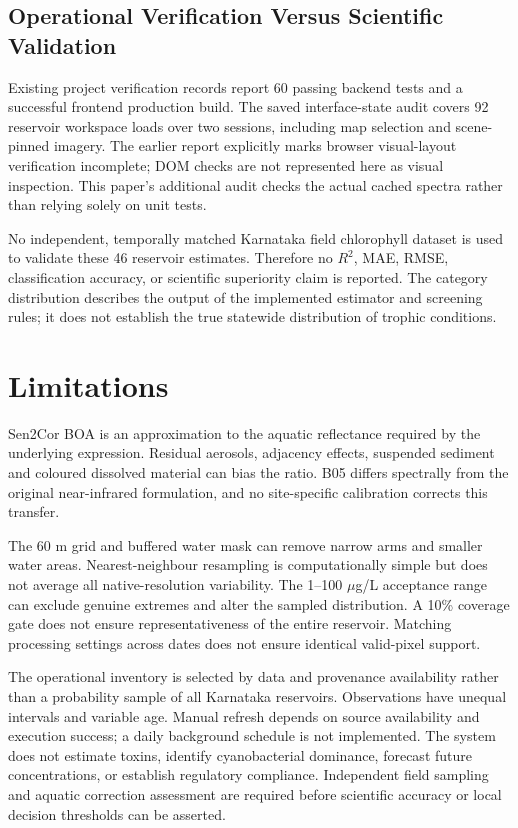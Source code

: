 \documentclass[conference]{IEEEtran}
\begin{document}
\subsection{Operational Verification Versus Scientific Validation}
Existing project verification records report 60 passing backend tests and a successful frontend production build. The saved interface-state audit covers 92 reservoir workspace loads over two sessions, including map selection and scene-pinned imagery. The earlier report explicitly marks browser visual-layout verification incomplete; DOM checks are not represented here as visual inspection. This paper's additional audit checks the actual cached spectra rather than relying solely on unit tests.

No independent, temporally matched Karnataka field chlorophyll dataset is used to validate these 46 reservoir estimates. Therefore no $R^2$, MAE, RMSE, classification accuracy, or scientific superiority claim is reported. The category distribution describes the output of the implemented estimator and screening rules; it does not establish the true statewide distribution of trophic conditions.

\section{Limitations}
Sen2Cor BOA is an approximation to the aquatic reflectance required by the underlying expression. Residual aerosols, adjacency effects, suspended sediment and coloured dissolved material can bias the ratio. B05 differs spectrally from the original near-infrared formulation, and no site-specific calibration corrects this transfer.

The 60 m grid and buffered water mask can remove narrow arms and smaller water areas. Nearest-neighbour resampling is computationally simple but does not average all native-resolution variability. The 1--100 $\mu$g/L acceptance range can exclude genuine extremes and alter the sampled distribution. A 10\% coverage gate does not ensure representativeness of the entire reservoir. Matching processing settings across dates does not ensure identical valid-pixel support.

The operational inventory is selected by data and provenance availability rather than a probability sample of all Karnataka reservoirs. Observations have unequal intervals and variable age. Manual refresh depends on source availability and execution success; a daily background schedule is not implemented. The system does not estimate toxins, identify cyanobacterial dominance, forecast future concentrations, or establish regulatory compliance. Independent field sampling and aquatic correction assessment are required before scientific accuracy or local decision thresholds can be asserted.
\end{document}
